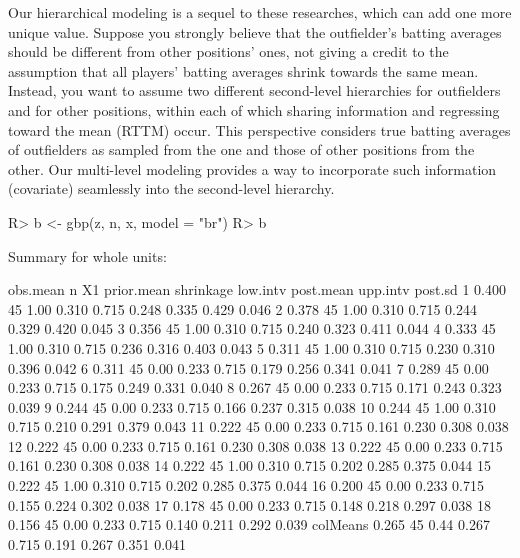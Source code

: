 \documentclass[article]{jss}
\begin{document}
Our hierarchical modeling is a sequel to these researches, which can add one more unique value. Suppose you strongly believe that the outfielder's batting averages should be different from other positions' ones, not giving a credit to the assumption that all players' batting averages shrink towards the same mean. Instead, you want to assume two different second-level hierarchies for outfielders and for other positions, within each of which sharing information and regressing toward the mean (RTTM) occur. This perspective considers true batting averages of outfielders as sampled from the one and those of other positions from the other. Our multi-level modeling provides a way to incorporate such information (covariate) seamlessly into the second-level hierarchy.
\begin{CodeChunk}
\begin{CodeInput}
R> b <- gbp(z, n, x, model = "br")
R> b
\end{CodeInput}
\begin{CodeOutput}
Summary for whole units: 

         obs.mean  n   X1 prior.mean shrinkage low.intv post.mean upp.intv post.sd
1           0.400 45 1.00      0.310     0.715    0.248     0.335    0.429   0.046
2           0.378 45 1.00      0.310     0.715    0.244     0.329    0.420   0.045
3           0.356 45 1.00      0.310     0.715    0.240     0.323    0.411   0.044
4           0.333 45 1.00      0.310     0.715    0.236     0.316    0.403   0.043
5           0.311 45 1.00      0.310     0.715    0.230     0.310    0.396   0.042
6           0.311 45 0.00      0.233     0.715    0.179     0.256    0.341   0.041
7           0.289 45 0.00      0.233     0.715    0.175     0.249    0.331   0.040
8           0.267 45 0.00      0.233     0.715    0.171     0.243    0.323   0.039
9           0.244 45 0.00      0.233     0.715    0.166     0.237    0.315   0.038
10          0.244 45 1.00      0.310     0.715    0.210     0.291    0.379   0.043
11          0.222 45 0.00      0.233     0.715    0.161     0.230    0.308   0.038
12          0.222 45 0.00      0.233     0.715    0.161     0.230    0.308   0.038
13          0.222 45 0.00      0.233     0.715    0.161     0.230    0.308   0.038
14          0.222 45 1.00      0.310     0.715    0.202     0.285    0.375   0.044
15          0.222 45 1.00      0.310     0.715    0.202     0.285    0.375   0.044
16          0.200 45 0.00      0.233     0.715    0.155     0.224    0.302   0.038
17          0.178 45 0.00      0.233     0.715    0.148     0.218    0.297   0.038
18          0.156 45 0.00      0.233     0.715    0.140     0.211    0.292   0.039
colMeans    0.265 45 0.44      0.267     0.715    0.191     0.267    0.351   0.041
\end{CodeOutput}
\end{CodeChunk}
\end{document}
